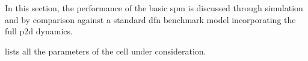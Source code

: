 
In this  section, the performance  of the  basic \gls{spm} is  discussed through
simulation  and  by comparison  against  a  standard \gls{dfn}  benchmark  model
incorporating the full \gls{p2d} dynamics.



 lists all the parameters of the cell under consideration.
